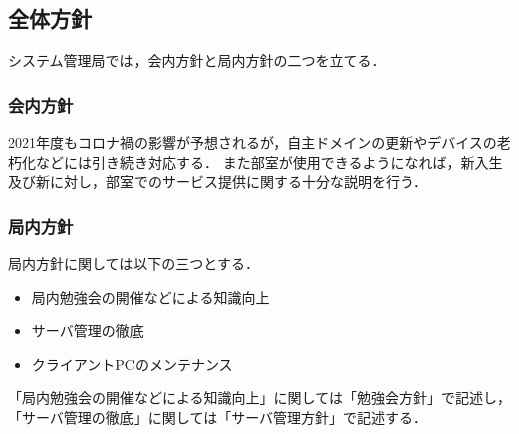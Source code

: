 \subsection*{全体方針}

システム管理局では，会内方針と局内方針の二つを立てる．

\subsubsection*{会内方針}
2021年度もコロナ禍の影響が予想されるが，自主ドメインの更新やデバイスの老朽化などには引き続き対応する．
また部室が使用できるようになれば，新入生及び新\secondGrade{}に対し，部室でのサービス提供に関する十分な説明を行う．

\subsubsection*{局内方針}
局内方針に関しては以下の三つとする．
\begin{itemize}
  \item 局内勉強会の開催などによる知識向上
  \item サーバ管理の徹底
  \item クライアントPCのメンテナンス
\end{itemize}
「局内勉強会の開催などによる知識向上」に関しては「勉強会方針」で記述し，
「サーバ管理の徹底」に関しては「サーバ管理方針」で記述する．
